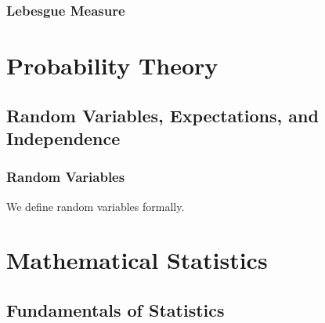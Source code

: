 \documentclass[thmcnt=section, 12pt]{elegantbook}
\begin{document}

\section{Lebesgue Measure}








\part{Probability Theory}





\chapter{Random Variables, Expectations, and Independence}


\section{Random Variables}

\par We define random variables formally.








\part{Mathematical Statistics}





\chapter{Fundamentals of Statistics}
\end{document}
